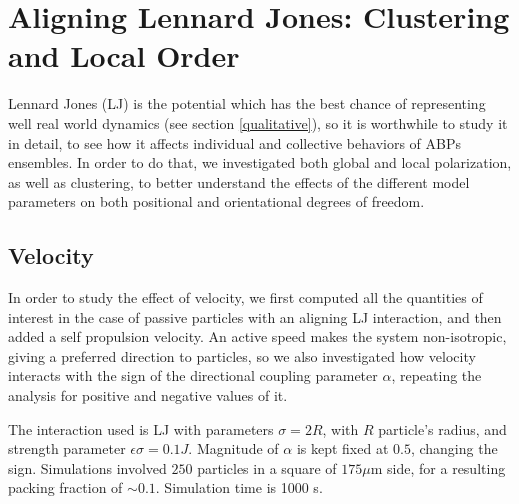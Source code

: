 \documentclass[../../master_thesis_np.tex]{subfiles}
\begin{document}
		\section{Aligning Lennard Jones: Clustering and Local Order}
		Lennard Jones (LJ) is the potential which has the best chance of representing well real world dynamics (see section \ref{qualitative}), so it is worthwhile to study it in detail, to see how it affects individual and collective behaviors of ABPs ensembles. In order to do that, we investigated both global and local polarization, as well as clustering, to better understand the effects of the different model parameters on both positional and orientational degrees of freedom.
		
		\subsection{Velocity}
		In order to study the effect of velocity, we first computed all the quantities of interest in the case of passive particles with an aligning LJ interaction, and then added a self propulsion velocity. An active speed makes the system non-isotropic, giving a preferred direction to particles, so we also investigated how velocity interacts with the sign of the directional coupling parameter $\alpha$, repeating the analysis for positive and negative values of it.
		
		The interaction used is LJ with parameters $\sigma = 2R$, with $R$ particle's radius, and strength parameter $\epsilon \sigma = 0.1 J$. Magnitude of $\alpha$ is kept fixed at $0.5$, changing the sign. Simulations involved $250$ particles in a square of $175 \mu\text{m}$ side, for a resulting packing fraction of $\sim 0.1$. Simulation time is 1000 s. 
		
\end{document}
